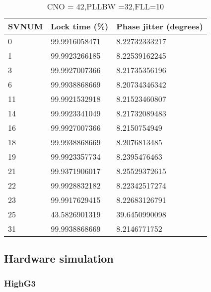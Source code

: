 \begin{table}[!htb]
\centering
\begin{tabular}{|l|l|l|}
\hline
\rowcolor[HTML]{C0C0C0} 
SVNUM & Lock time (\%) & Phase jitter (degrees) \\ \hline
0     & 99.9916058471  & 8.22732333217          \\ \hline
\rowcolor[HTML]{EFEFEF} 
1     & 99.9923266185  & 8.22539162245          \\ \hline
3     & 99.9927007366  & 8.21735356196          \\ \hline
\rowcolor[HTML]{EFEFEF} 
6     & 99.9938868669  & 8.20734346342          \\ \hline
11    & 99.9921532918  & 8.21523460807          \\ \hline
\rowcolor[HTML]{EFEFEF} 
14    & 99.9923341049  & 8.21732089483          \\ \hline
16    & 99.9927007366  & 8.2150754949           \\ \hline
\rowcolor[HTML]{EFEFEF} 
18    & 99.9938868669  & 8.2076813485           \\ \hline
19    & 99.9923357734  & 8.2395476463           \\ \hline
\rowcolor[HTML]{EFEFEF} 
21    & 99.9371906017  & 8.25529372615          \\ \hline
22    & 99.9928832182  & 8.22342517274          \\ \hline
\rowcolor[HTML]{EFEFEF} 
23    & 99.9917629415  & 8.22683126791          \\ \hline
25    & 43.5826901319  & 39.6450990098          \\ \hline
\rowcolor[HTML]{EFEFEF} 
31    & 99.9938868669  & 8.2146771752           \\ \hline
\end{tabular}
\caption{CNO = 42,PLLBW =32,FLL=10}
\label{my-label}
\end{table}

\subsection{Hardware simulation}

\subsubsection{HighG3}

